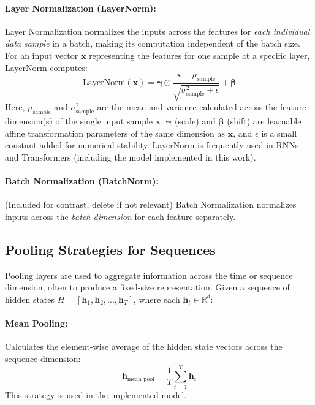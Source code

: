 \begin{appendices}
  \paragraph{Layer Normalization (LayerNorm):}
  Layer Normalization normalizes the inputs across the features for \textit{each individual data sample} in a batch, making its computation independent of the batch size. For an input vector \( \bm{x} \) representing the features for one sample at a specific layer, LayerNorm computes:
  \begin{equation}
    \text{LayerNorm}(\bm{x}) = \bm{\gamma} \odot \frac{\bm{x} - \mu_{\text{sample}}}{\sqrt{\sigma^2_{\text{sample}} + \epsilon}} + \bm{\beta}
    \label{eq:layernorm} %
  \end{equation}
  Here, \( \mu_{\text{sample}} \) and \( \sigma^2_{\text{sample}} \) are the mean and variance calculated across the feature dimension(s) of the single input sample \( \bm{x} \). \( \bm{\gamma} \) (scale) and \( \bm{\beta} \) (shift) are learnable affine transformation parameters of the same dimension as \( \bm{x} \), and \( \epsilon \) is a small constant added for numerical stability. LayerNorm is frequently used in RNNs and Transformers (including the model implemented in this work).

  \paragraph{Batch Normalization (BatchNorm):}
  (Included for contrast, delete if not relevant) Batch Normalization normalizes inputs across the \textit{batch dimension} for each feature separately.

  \subsection{Pooling Strategies for Sequences}
  Pooling layers are used to aggregate information across the time or sequence dimension, often to produce a fixed-size representation. Given a sequence of hidden states \( H = [\bm{h}_1, \bm{h}_2, ..., \bm{h}_T] \), where each \( \bm{h}_t \in \mathbb{R}^d \):

  \paragraph{Mean Pooling:}
  Calculates the element-wise average of the hidden state vectors across the sequence dimension:
  \begin{equation}
    \bm{h}_{\text{mean\_pool}} = \frac{1}{T} \sum_{t=1}^T \bm{h}_t
  \end{equation}
  This strategy is used in the implemented model.


\end{appendices}
